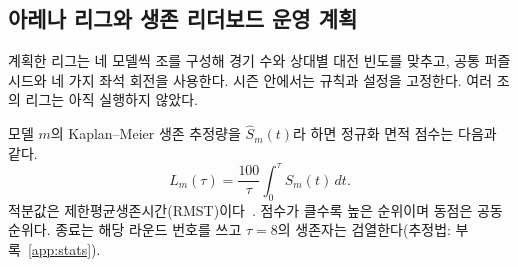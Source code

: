 \subsection{아레나 리그와 생존 리더보드 운영 계획}\label{sec:league}
계획한 리그는 네 모델씩 조를 구성해 경기 수와 상대별 대전 빈도를 맞추고, 공통 퍼즐 시드와 네 가지 좌석 회전을 사용한다. 시즌 안에서는 규칙과 설정을 고정한다. 여러 조의 리그는 아직 실행하지 않았다.

모델 $m$의 Kaplan--Meier 생존 추정량을 $\widehat S_m(t)$라 하면 정규화 면적 점수는 다음과 같다.
\begin{equation}
L_m(\tau)=\frac{100}{\tau}\int_0^\tau\widehat S_m(t)\,dt.
\label{eq:league}
\end{equation}
적분값은 제한평균생존시간(RMST)이다~\citep{uno2014moving}. 점수가 클수록 높은 순위이며 동점은 공동 순위다. 종료는 해당 라운드 번호를 쓰고 $\tau=8$의 생존자는 검열한다(추정법: 부록~\ref{app:stats}).
